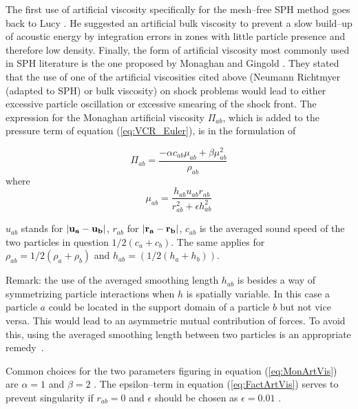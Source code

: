 \documentclass{report}
\begin{document}
The first use of artificial viscosity specifically for the mesh--free SPH method goes back to Lucy \cite{Lucy1977}. He suggested an artificial bulk viscosity to
prevent a slow build--up of acoustic energy by integration errors in zones with
little particle presence and therefore low density. 
Finally, the form of artificial viscosity most commonly used in SPH
literature \cite{Liu2003} is the one proposed by Monaghan and
Gingold \cite{Monaghan1983}. They stated that the use of one of the artificial
viscosities cited above (Neumann Richtmyer (adapted to SPH) or bulk
viscosity) on shock problems would lead to either excessive particle
oscillation or excessive smearing of the shock front. The expression for the Monaghan artificial viscosity $\Pi_{ab}$, which is added to the pressure term of
equation (\ref{eq:VCR_Euler}), is in the formulation of \cite{Monaghan1992}

\begin{equation}
\label{eq:MonArtVis}
\Pi_{\mathit{ab}}= \frac{-\alpha c_{\mathit{ab}}\mu_{ab}+\beta \mu_{ab}^2}{\rho_{ab}}
\end{equation}
where 
\begin{equation}
\label{eq:FactArtVis}
\mu_{ab}=\frac{h_{ab}u_{ab}r_{ab}}{r_{ab}^2+\epsilon h_{ab}^2}
\end{equation}

$u_{ab}$ stands for $|{\bf u_a}-{\bf u_b}|$, $r_{ab}$ for $|{\bf r_a}-{\bf r_b}|$, $c_{ab}$ is the
averaged sound speed of the two particles in question $1/2(c_a+c_b)$. The same
applies for $\rho_{ab}=1/2(\rho_a+\rho_b)$ and $h_{ab}=(1/2(h_a+h_b))$. 

Remark: the use of the averaged smoothing length $h_{ab}$ is besides a way of symmetrizing particle interactions when $h$ is spatially variable. In this case a particle $a$ could be located in the support domain of a particle $b$ but not vice versa. This would lead to an asymmetric mutual contribution of forces. To avoid this, using the averaged smoothing length between two particles is an appropriate remedy~\cite{Liu2003}.

Common choices for the two parameters figuring in equation (\ref{eq:MonArtVis}) are $\alpha=1$ and $\beta=2$ \cite{Monaghan1992}. The epsilon--term in equation (\ref{eq:FactArtVis}) serves to prevent singularity if $r_{ab}=0$ and $\epsilon$ should be chosen as $\epsilon=0.01$ \cite{Monaghan1992}.
\end{document}
